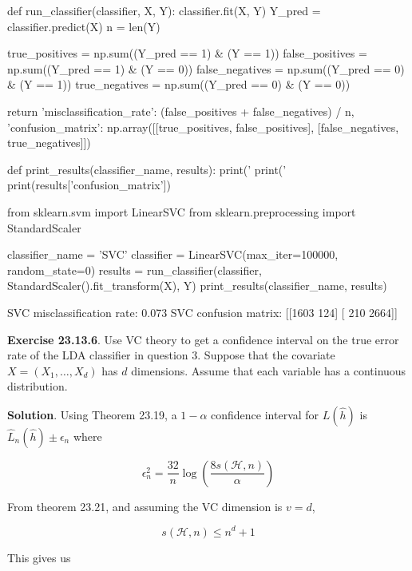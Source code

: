 \begin{python}
def run_classifier(classifier, X, Y):
    classifier.fit(X, Y)
    Y_pred = classifier.predict(X)
    n = len(Y)
    
    true_positives = np.sum((Y_pred == 1) & (Y == 1))
    false_positives = np.sum((Y_pred == 1) & (Y == 0))
    false_negatives = np.sum((Y_pred == 0) & (Y == 1))
    true_negatives = np.sum((Y_pred == 0) & (Y == 0))

    return {
        'misclassification_rate': (false_positives + false_negatives) / n,
        'confusion_matrix': np.array([[true_positives, false_positives], [false_negatives, true_negatives]])
    }

def print_results(classifier_name, results):
    print('%
    print('%
    print(results['confusion_matrix'])
\end{python}

\begin{python}
from sklearn.svm import LinearSVC
from sklearn.preprocessing import StandardScaler

classifier_name = 'SVC'
classifier = LinearSVC(max_iter=100000, random_state=0)
results = run_classifier(classifier, StandardScaler().fit_transform(X), Y)
print_results(classifier_name, results)
\end{python}

\begin{console}
SVC misclassification rate: 0.073
SVC confusion matrix:
[[1603  124]
 [ 210 2664]]
\end{console}

\textbf{Exercise 23.13.6}. Use VC theory to get a confidence interval on
the true error rate of the LDA classifier in question 3. Suppose that
the covariate \(X = (X_1, \dots, X_d)\) has \(d\) dimensions. Assume
that each variable has a continuous distribution.

\textbf{Solution}. Using Theorem 23.19, a \(1 - \alpha\) confidence
interval for \(L(\hat{h})\) is \(\hat{L}_n(\hat{h}) \pm \epsilon_n\)
where

\[ \epsilon_n^2 = \frac{32}{n} \log \left( \frac{8 s(\mathcal{H}, n)}{\alpha} \right) \]

From theorem 23.21, and assuming the VC dimension is \(v = d\),

\[ s(\mathcal{H}, n) \leq n^d + 1 \]

This gives us

